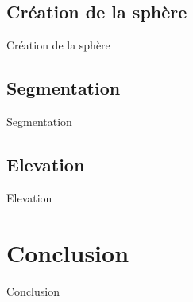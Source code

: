 \documentclass{beamer}
\begin{document}
\subsection{Création de la sphère}
\begin{frame}{Création de la sphère}

\end{frame}

\subsection{Segmentation}
\begin{frame}{Segmentation}

\end{frame}
\subsection{Elevation}
\begin{frame}{Elevation}

\end{frame}


\section{Conclusion}
\begin{frame}{Conclusion}

\end{frame}
\end{document}
